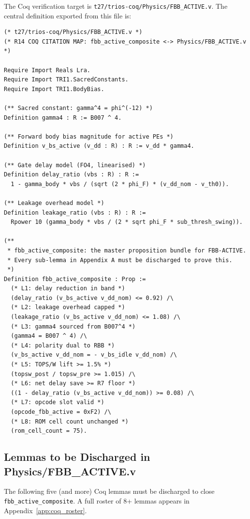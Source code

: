 \documentclass[12pt,a4paper]{report}
\theoremstyle{plain}
\theoremstyle{definition}
\theoremstyle{remark}
\begin{document}
The Coq verification target is \texttt{t27/trios-coq/Physics/FBB\_ACTIVE.v}.  The central
definition exported from this file is:

\begin{lstlisting}[style=coq, caption={Coq definition of \texttt{fbb\_active\_composite}.}]
(* t27/trios-coq/Physics/FBB_ACTIVE.v *)
(* R14 COQ CITATION MAP: fbb_active_composite <-> Physics/FBB_ACTIVE.v *)

Require Import Reals Lra.
Require Import TRI1.SacredConstants.
Require Import TRI1.BodyBias.

(** Sacred constant: gamma^4 = phi^(-12) *)
Definition gamma4 : R := B007 ^ 4.

(** Forward body bias magnitude for active PEs *)
Definition v_bs_active (v_dd : R) : R := v_dd * gamma4.

(** Gate delay model (FO4, linearised) *)
Definition delay_ratio (vbs : R) : R :=
  1 - gamma_body * vbs / (sqrt (2 * phi_F) * (v_dd_nom - v_th0)).

(** Leakage overhead model *)
Definition leakage_ratio (vbs : R) : R :=
  Rpower 10 (gamma_body * vbs / (2 * sqrt phi_F * sub_thresh_swing)).

(**
 * fbb_active_composite: the master proposition bundle for FBB-ACTIVE.
 * Every sub-lemma in Appendix A must be discharged to prove this.
 *)
Definition fbb_active_composite : Prop :=
  (* L1: delay reduction in band *)
  (delay_ratio (v_bs_active v_dd_nom) <= 0.92) /\
  (* L2: leakage overhead capped *)
  (leakage_ratio (v_bs_active v_dd_nom) <= 1.08) /\
  (* L3: gamma4 sourced from B007^4 *)
  (gamma4 = B007 ^ 4) /\
  (* L4: polarity dual to RBB *)
  (v_bs_active v_dd_nom = - v_bs_idle v_dd_nom) /\
  (* L5: TOPS/W lift >= 1.5% *)
  (topsw_post / topsw_pre >= 1.015) /\
  (* L6: net delay save >= R7 floor *)
  ((1 - delay_ratio (v_bs_active v_dd_nom)) >= 0.08) /\
  (* L7: opcode slot valid *)
  (opcode_fbb_active = 0xF2) /\
  (* L8: ROM cell count unchanged *)
  (rom_cell_count = 75).
\end{lstlisting}

\subsection{Lemmas to be Discharged in Physics/FBB\_ACTIVE.v}

The following five (and more) Coq lemmas must be discharged to close \texttt{fbb\_active\_composite}.
A full roster of 8+ lemmas appears in Appendix~\ref{app:coq_roster}.
\end{document}
